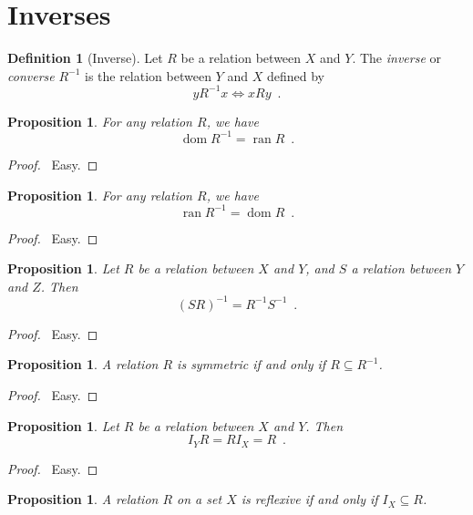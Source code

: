 \documentclass{report}
\let\qed\relax
\newtheorem{prop}[ax]{Proposition}
\theoremstyle{definition}
\newtheorem{df}[ax]{Definition}
\newcommand{\dom}{\ensuremath{\operatorname{dom}}}
\newcommand{\ran}{\ensuremath{\operatorname{ran}}}
\begin{document}
\section{Inverses}

\begin{df}[Inverse]
Let $R$ be a relation between $X$ and $Y$. The \emph{inverse} or \emph{converse} $R^{-1}$ is the relation between $Y$ and $X$ defined by
\[ y R^{-1} x \Leftrightarrow x R y \enspace . \]
\end{df}

\begin{prop}
\label{prop:dominv}
For any relation $R$, we have
\[ \dom R^{-1} = \ran R \enspace . \]
\end{prop}

\begin{proof}
\pf\ Easy. \qed
\end{proof}

\begin{prop}
For any relation $R$, we have
\[ \ran R^{-1} = \dom R \enspace . \]
\end{prop}

\begin{proof}
\pf\ Easy. \qed
\end{proof}

\begin{prop}
Let $R$ be a relation between $X$ and $Y$, and $S$ a relation between $Y$ and $Z$. Then
\[ (SR)^{-1} = R^{-1}S^{-1} \enspace . \]
\end{prop}

\begin{proof}
\pf\ Easy. \qed
\end{proof}

\begin{prop}
A relation $R$ is symmetric if and only if $R \subseteq R^{-1}$.
\end{prop}

\begin{proof}
\pf\ Easy. \qed
\end{proof}

\begin{prop}
Let $R$ be a relation between $X$ and $Y$. Then
\[ I_Y R = R I_X = R \enspace . \]
\end{prop}

\begin{proof}
\pf\ Easy. \qed
\end{proof}

\begin{prop}
A relation $R$ on a set $X$ is reflexive if and only if $I_X \subseteq R$.
\end{prop}
\end{document}
